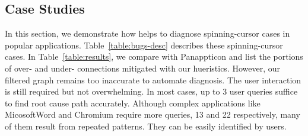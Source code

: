 \subsection{Case Studies}\label{sec:casestudy}

In this section, we demonstrate how \xxx helps to diagnose \nbug spinning-cursor
cases in popular applications. Table~\ref{table:bugs-desc} describes these
spinning-cursor cases. In Table~\ref{table:results}, we compare \xxx with
Panappticon and list the portions of over- and under- connections mitigated with
our hueristics. However, our filtered graph remains too inaccurate to automate
diagnosis. The user interaction is still required but not overwhelming. In most
cases, up to 3 user queries suffice to find root cause path accurately. Although
complex applications like MicosoftWord and Chromium require more queries, 13 and
22 respectively, many of them result from repeated patterns. They can be easily
identified by users. 




